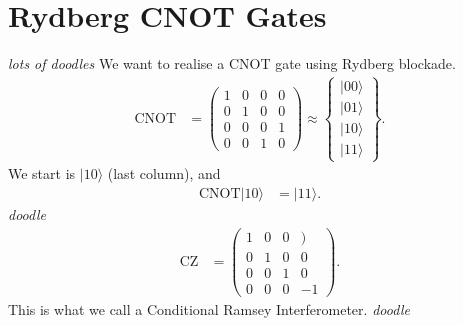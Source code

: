 \documentclass[a4paper, 11pt, normalem]{report}
\begin{document}
\chapter{Rydberg CNOT Gates}
\emph{lots of doodles}
We want to realise a CNOT gate using Rydberg blockade.
\begin{align}
    \text{CNOT} &= \begin{pmatrix} 1 & 0 & 0 & 0 \\ 0 & 1 & 0 & 0 \\ 0 & 0 & 0 & 1 \\ 0 & 0 & 1 & 0 \end{pmatrix} \approx \begin{Bmatrix} |00\rangle \\ |01\rangle \\ |10\rangle \\ |11\rangle \end{Bmatrix}.
\end{align}
We start is $|10\rangle$ (last column), and
\begin{align}
    \text{CNOT}|10\rangle &= |11\rangle.
\end{align}
\textit{doodle}
\begin{align}
    \text{CZ} &= \begin{pmatrix} 1 &0&0&) \\ 0&1&0&0 \\ 0&0&1&0 \\ 0&0&0&-1\end{pmatrix}.
\end{align}
This is what we call a Conditional Ramsey Interferometer.
\textit{doodle}
\end{document}
